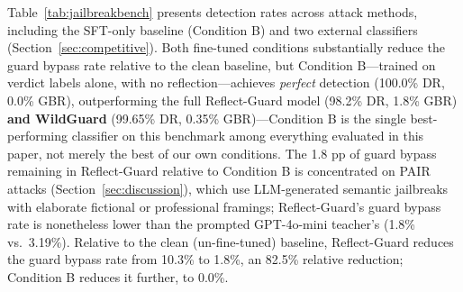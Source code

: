 \documentclass[Superintelligence,article,submit,pdftex,moreauthors]{Definitions/mdpi}
\begin{document}
Table~\ref{tab:jailbreakbench} presents detection rates across attack methods, including the SFT-only baseline (Condition B) and two external classifiers (Section~\ref{sec:competitive}). Both fine-tuned conditions substantially reduce the guard bypass rate relative to the clean baseline, but Condition B---trained on verdict labels alone, with no reflection---achieves \emph{perfect} detection (100.0\% DR, 0.0\% GBR), outperforming the full Reflect-Guard model (98.2\% DR, 1.8\% GBR) \textbf{and WildGuard} (99.65\% DR, 0.35\% GBR)---Condition B is the single best-performing classifier on this benchmark among everything evaluated in this paper, not merely the best of our own conditions. The 1.8 pp of guard bypass remaining in Reflect-Guard relative to Condition B is concentrated on PAIR attacks (Section~\ref{sec:discussion}), which use LLM-generated semantic jailbreaks with elaborate fictional or professional framings; Reflect-Guard's guard bypass rate is nonetheless lower than the prompted GPT-4o-mini teacher's (1.8\% vs.\ 3.19\%). Relative to the clean (un-fine-tuned) baseline, Reflect-Guard reduces the guard bypass rate from 10.3\% to 1.8\%, an 82.5\% relative reduction; Condition B reduces it further, to 0.0\%.

\begin{table}[H]
  \caption{JailbreakBench detection rates by attack method. DR = detection rate; GBR = guard bypass rate ($=1-\mathrm{DR}$ overall). All prompts are ground-truth harmful; higher DR is better. 95\% bootstrap confidence intervals (2{,}000 resamples) are shown for overall DR for Conditions 0/B/D; WildGuard and Prompted-CoT (external, Section~\ref{sec:competitive}) are single evaluation runs with no CI. Best per row in \textbf{bold} (ties bolded jointly).\label{tab:jailbreakbench}}
  \centering
  \footnotesize
\end{table}
\end{document}
